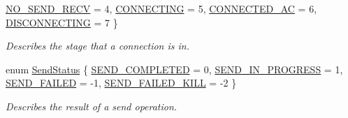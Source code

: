 \begin{DoxyCompactItemize}
\par
\hyperlink{class_net_utility_a7eae52138f8bd597ffc67ebf07e86b6dabfdb16770f1140f86d621739ffe89560}{NO\_\-SEND\_\-RECV} =  4, 
\hyperlink{class_net_utility_a7eae52138f8bd597ffc67ebf07e86b6da9d19ff7a0b7766eb4176922a19ff44af}{CONNECTING} =  5, 
\hyperlink{class_net_utility_a7eae52138f8bd597ffc67ebf07e86b6da7b6f70df4b1b357e16aee1e4ca169aa2}{CONNECTED\_\-AC} =  6, 
\hyperlink{class_net_utility_a7eae52138f8bd597ffc67ebf07e86b6da9a6a615b574b5d529729238b1d956ee6}{DISCONNECTING} =  7
 \}
\begin{DoxyCompactList}\small\item\em Describes the stage that a connection is in. \item\end{DoxyCompactList}\item 
enum \hyperlink{class_net_utility_a8051eca61204ffd818281419bbf44736}{SendStatus} \{ \hyperlink{class_net_utility_a8051eca61204ffd818281419bbf44736acec16f03b79a6de35d6ab9d5ceb58ff7}{SEND\_\-COMPLETED} =  0, 
\hyperlink{class_net_utility_a8051eca61204ffd818281419bbf44736a802cb48d857d70f62624326eea294406}{SEND\_\-IN\_\-PROGRESS} =  1, 
\hyperlink{class_net_utility_a8051eca61204ffd818281419bbf44736a27389038f252e2ad34e12b28c9f93a00}{SEND\_\-FAILED} =  -\/1, 
\hyperlink{class_net_utility_a8051eca61204ffd818281419bbf44736abc96a939bc1f0dfffc56f4568ce9dad4}{SEND\_\-FAILED\_\-KILL} =  -\/2
 \}
\begin{DoxyCompactList}\small\item\em Describes the result of a send operation. \item\end{DoxyCompactList}\end{DoxyCompactItemize}
